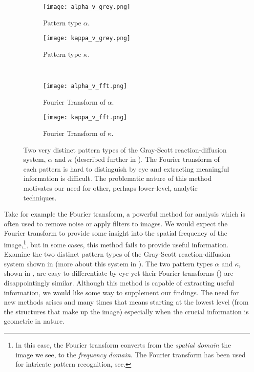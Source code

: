 \begin{figure}[h]
        \centering
        \begin{subfigure}[b]{0.35\textwidth}
        	\centering
                \texttt{[image: alpha\_v\_grey.png]}
                \caption{Pattern type $\alpha$.}
                \label{fig:alphagrey_fft}
        \end{subfigure}
        \begin{subfigure}[b]{0.35\textwidth}
        	\centering
                \texttt{[image: kappa\_v\_grey.png]}
                \caption{Pattern type $\kappa$.}
                \label{fig:kappagrey_fft}
        \end{subfigure} \\
        
        \begin{subfigure}[b]{0.35\textwidth}
        	\centering
                \texttt{[image: alpha\_v\_fft.png]}
                \caption{Fourier Transform of $\alpha$.}
                \label{fig:alphafft}
        \end{subfigure}
        \begin{subfigure}[b]{0.35\textwidth}
        	\centering
                \texttt{[image: kappa\_v\_fft.png]}
                \caption{Fourier Transform of $\kappa$.}
                \label{fig:kappafft}
        \end{subfigure}
        \caption{Two very distinct pattern types of the Gray-Scott reaction-diffusion system, $\alpha$ and $\kappa$ (described further in ). The Fourier transform of each pattern is hard to distinguish by eye and extracting meaningful information is difficult. The problematic nature of this method motivates our need for other, perhaps lower-level, analytic techniques.}\label{fig:fourierfail}
\end{figure}

	Take for example the Fourier transform, a powerful method for analysis which is often used to remove noise or apply filters to images. We would expect the Fourier transform to provide some insight into the spatial frequency of the image,\footnote{In this case, the Fourier transform converts from the \textit{spatial domain} the image we see, to the \textit{frequency domain}. The Fourier transform has been used for intricate pattern recognition, see.}, but in some cases, this method fails to provide useful information. Examine the two distinct pattern types of the Gray-Scott reaction-diffusion system shown in  (more about this system in ). The two pattern types $\alpha$ and $\kappa$, shown in , are easy to differentiate by eye yet their Fourier transforms () are disappointingly similar. Although this method is capable of extracting useful information, we would like some way to supplement our findings. The need for new methods arises and many times that means starting at the lowest level (\ie from the structures that make up the image) especially when the crucial information is geometric in nature.
	
